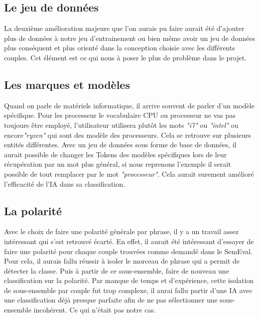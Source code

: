 \documentclass[12pt ,a4paper ]{article}
\begin{document}
\begin{multicols}{2}
\subsection{Le jeu de données}
La deuxième amélioration majeure que l'on aurais pu faire aurait été d'ajouter plus de données à notre jeu d'entrainement ou bien même avoir un jeu de données plus conséquent et plus orienté dans la conception choisie avec les différents couples. Cet élément est ce qui nous à poser le plus de problème dans le projet.

\subsection{Les marques et modèles}
Quand on parle de matériels informatique, il arrive souvent de parler d'un modèle spécifique. Pour les processeur le vocabulaire CPU ou processeur ne vas pas toujours être employé, l'utilisateur utilisera plutôt les mots \textit{"i7"} ou \textit{"intel"} ou encore\textit{"ryzen"} qui sont des modèle des processeurs. Cela se retrouve sur plusieurs entités différentes. Avec un jeu de données sous forme de base de données, il aurait possible de changer les Tokens des modèles spécifiques lors de leur récupération par un mot plus général, si nous reprenons l'exemple il serait possible de tout remplacer par le mot \textit{"processeur"}. Cela aurait surement amélioré l'efficacité de l'IA dans sa classification.

\subsection{La polarité}
Avec le choix de faire une polarité générale par phrase, il y a un travail assez intéressant qui s'est retrouvé écarté. En effet, il aurait été intéressant d'essayer de faire une polarité pour chaque couple trouvées comme demandé dans le SemEval. Pour cela, il aurais fallu réussir à isoler le morceau de phrase qui a permit de détecter la classe. Puis à partir de ce sous-ensemble, faire de nouveau une classification sur la polarité. Par manque de temps et d'expérience, cette isolation de sous-ensemble par couple fut trop complexe, il aurai fallu partir d'une IA avec une classification déjà presque parfaite afin de ne pas sélectionner une sous-ensemble incohérent. Ce qui n'était pas notre cas. 

\end{multicols}
\newpage
\end{document}
